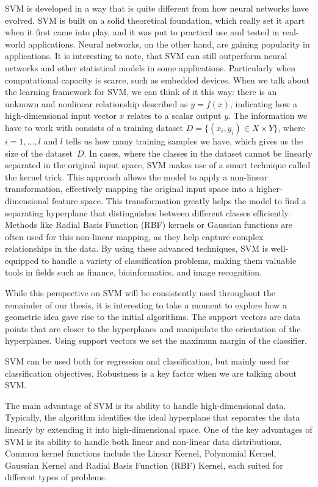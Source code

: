 \documentclass[english,12pt,oneside,a4paper]{article}
\begin{document}
		SVM is developed in a way that is quite different from how neural networks have evolved. SVM is built on a solid theoretical foundation, which really set it apart when it first came into play, and it was put to practical use and tested in real-world applications. Neural networks, on the other hand, are gaining popularity in applications.  It is interesting to note, that SVM can still outperform neural networks and other statistical models in some applications. Particularly when computational capacity is scarce, such as embedded devices. When we talk about the learning framework for SVM, we can think of it this way: there is an unknown and nonlinear relationship described as $y = f(x)$, indicating how a high-dimensional input vector $x$ relates to a scalar output $y$. The information we have to work with consists of a training dataset $ D = \{(x_i, y_i) \in X \times Y\} $, where $ i = 1, \ldots, l $ and $ l $ tells us how many training samples we have, which gives us the size of the dataset~$D$. In cases, where the classes in the dataset cannot be linearly separated in the original input space, SVM makes use of a smart technique called the kernel trick. This approach allows the model to apply a non-linear transformation, effectively mapping the original input space into a higher-dimensional feature space. This transformation greatly helps the model to find a separating hyperplane that distinguishes between different classes efficiently. Methods like Radial Basis Function (RBF) kernels or Gaussian functions are often used for this non-linear mapping, as they help capture complex relationships in the data. By using these advanced techniques, SVM is well-equipped to handle a variety of classification problems, making them valuable tools in fields such as finance, bioinformatics, and image recognition.
		
		While this perspective on SVM will be consistently used throughout the remainder of our thesis, it is interesting to take a moment to explore how a geometric idea gave rise to the initial algorithms. The support vectors are data points that are closer to the hyperplanes and manipulate the orientation of the hyperplanes. Using support vectors we set the maximum margin of the classifier.
		
		SVM can be used both for regression and classification, but mainly used for classification objectives. Robustness is a key factor when we are talking about SVM.
		
		The main advantage of SVM is its ability to handle high-dimensional data. Typically, the algorithm identifies the ideal hyperplane that separates the data linearly by extending it into high-dimensional space.
		One of the key advantages of SVM is its ability to handle both linear and non-linear data distributions. 
		 Common kernel functions include the Linear Kernel, Polynomial Kernel, Gaussian Kernel and Radial Basis Function (RBF) Kernel, each suited for different types of problems.
\end{document}
